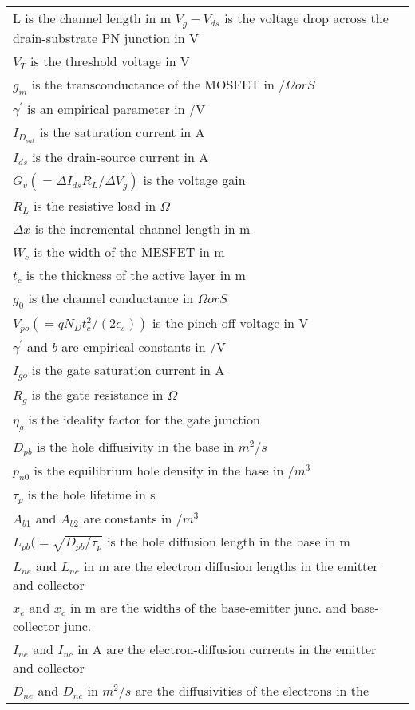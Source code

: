 \documentclass[10pt,landscape]{article}
\begin{document}
\begin{multicols}{3}
\begin{tabular}{@{}ll@{}}
L is the channel length in m
$ V_g-V_{ds}$ is the voltage drop across the drain-substrate PN junction in V \\
$ V_T$ is the threshold voltage in V \\
$ g_m$ is the transconductance of the MOSFET in $/\Omega or S$ \\
$ \gamma^{\prime}$ is an empirical parameter in /V \\
$ I_{D_{sat}}$ is the saturation current in A \\
$ I_{ds}$ is the drain-source current in A \\
$ G_v (=\Delta I_{ds}R_L/\Delta V_g)$ is the voltage gain \\
$ R_L$ is the resistive load in $\Omega$ \\
$ \Delta x$ is the incremental channel length in m \\
$ W_c$ is the width of the MESFET  in m \\
$ t_c$ is the thickness of the active layer in m \\
$ g_0$ is the channel conductance in $\Omega or S$ \\
$ V_{po} (=qN_Dt^2_c/(2\epsilon_s))$ is the pinch-off voltage in V \\
$ \gamma^{\prime}$ and $b$ are empirical constants in /V \\
$ I_{go}$ is the gate saturation current in A \\
$ R_g$ is the gate resistance in $\Omega$ \\
$ \eta_g$ is the ideality factor for the gate junction \\
$ D_{pb}$ is the hole diffusivity in the base in $m^2/s$ \\
$ p_{n0}$ is the equilibrium hole density in the base in $/m^3$ \\
$ \tau_p$ is the hole lifetime in s \\
$ A_{b1}$ and $A_{b2}$ are constants in $/m^3$ \\
$ L_{pb} (=\sqrt{D_{pb}/\tau_p}$ is the hole diffusion length in the base in m \\
$ L_{ne}$ and $L_{nc}$ in m are the electron diffusion lengths in the emitter and collector \\
$ x_e$ and $x_c$ in m are the widths of the base-emitter junc. and base-collector junc. \\
$ I_{ne}$ and $I_{nc}$ in A are the electron-diffusion currents in the emitter and collector \\
$ D_{ne}$ and $D_{nc}$ in $m^2/s$ are the diffusivities of the electrons in the \\

\end{tabular}
\end{multicols}
\end{document}
